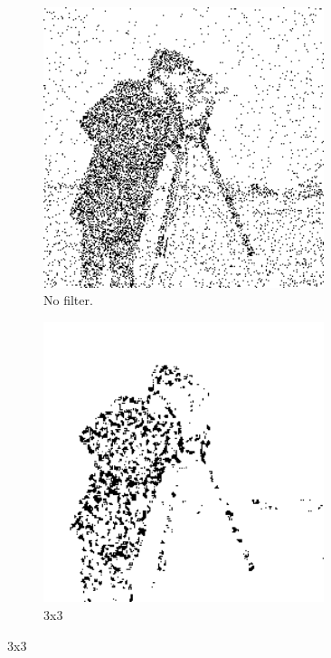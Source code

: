 \begin{figure}[h]
    \centering

    \begin{subfigure}{0.3\textwidth}
        \includegraphics[width=0.9\textwidth]{../code/2_out/2-1_gaus.png}
        \caption{No filter.}
        \label{fig:2-2-2:1}
    \end{subfigure}
    \begin{subfigure}{0.3\textwidth}
        \includegraphics[width=0.9\textwidth]{../code/2_out/2-2_gaus_3x3.png}
        \caption{3x3}
        \label{fig:2-2-2:2}
    \end{subfigure}


\end{figure}
